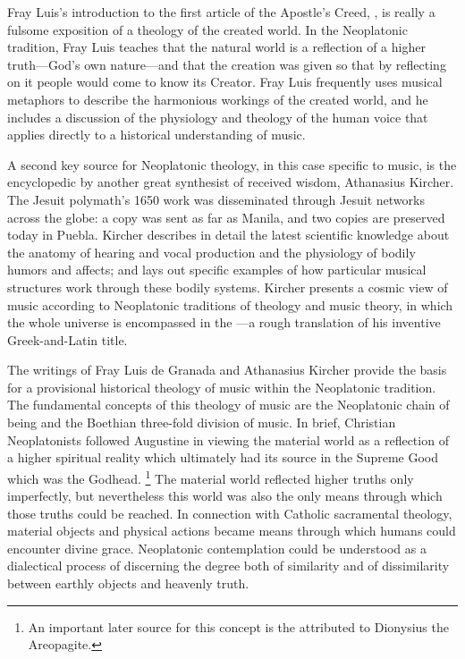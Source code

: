 Fray Luis's introduction to the first article of the Apostle's Creed, , is really a fulsome exposition of a theology of the created world.
In the Neoplatonic tradition, Fray Luis teaches that the natural world is a reflection of a higher truth---God's own nature---and that the creation was given so that by reflecting on it people would come to know its Creator.
Fray Luis frequently uses musical metaphors to describe the harmonious workings of the created world, and he includes a discussion of the physiology and theology of the human voice that applies directly to a historical understanding of music.

A second key source for Neoplatonic theology, in this case specific to music, is the encyclopedic  by another great synthesist of received wisdom, Athanasius Kircher.
The Jesuit polymath's 1650 work was disseminated through Jesuit networks across the globe: a copy was sent as far as Manila, and two copies are preserved today in Puebla.
Kircher describes in detail the latest scientific knowledge about the anatomy of hearing and vocal production and the physiology of bodily humors and affects; and lays out specific examples of how particular musical structures work through these bodily systems.
Kircher presents a cosmic view of music according to Neoplatonic traditions of theology and music theory, in which the whole universe is encompassed in the ---a rough translation of his inventive Greek-and-Latin title.%

The writings of Fray Luis de Granada and Athanasius Kircher provide the basis for a provisional historical theology of music within the Neoplatonic tradition. 
The fundamental concepts of this theology of music are the Neoplatonic chain of being and the Boethian three-fold division of music.
In brief, Christian Neoplatonists followed Augustine in viewing the material world as a reflection of a higher spiritual reality which ultimately had its source in the Supreme Good which was the Godhead.%
	\footnote{%
	An important later source for this concept is the  attributed to Dionysius the Areopagite. %
	}
The material world reflected higher truths only imperfectly, but nevertheless this world was also the only means through which those truths could be reached.
In connection with Catholic sacramental theology, material objects and physical actions became means through which humans could encounter divine grace.
Neoplatonic contemplation could be understood as a dialectical process of discerning the degree both of similarity and of dissimilarity between earthly objects and heavenly truth.


